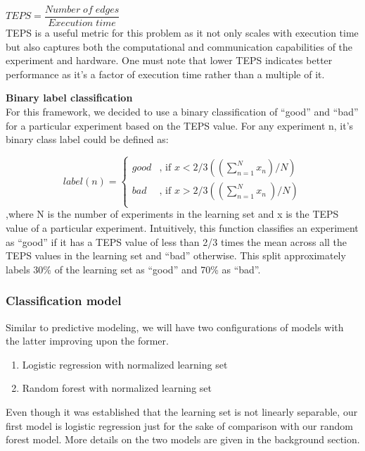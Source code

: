    $TEPS= \dfrac{Number\;of\; edges}{Execution\;time}$ \\


TEPS is a useful metric for this problem as it not only scales with execution time but also captures both the computational and communication capabilities of the experiment and hardware. One must note that lower TEPS indicates better performance as it's a factor of execution time rather than a multiple of it. 

\textbf{Binary label classification}\\
For this framework, we decided to use a binary classification of ``good'' and ``bad'' for a particular experiment based on the TEPS value. For any experiment n, it's binary class label could be defined as:


\[
  label(n) =
  \begin{cases}
                                   good & \text{, if $x < 2/3((\sum_{n=1}^{N} x_{n} )/N)$} \\
                                   bad & \text{, if $x > 2/3((\sum_{n=1}^{N} x_{n} \ )/N)$} \\
  \end{cases}
\]
 ,where N is the number of experiments in the learning set and x is the TEPS value of a particular experiment. Intuitively, this function classifies an experiment as ``good'' if it has a TEPS value of less than 2/3 times the mean across all the TEPS values in the learning set and ``bad'' otherwise. This split approximately labels 30\% of the learning set as ``good'' and 70\% as ``bad''.
   
\subsubsection{Classification model}
Similar to predictive modeling, we will have two configurations of models with the latter improving upon the former. 


\begin{enumerate}
    \item Logistic regression with normalized learning set
    \item Random forest with normalized learning set
\end{enumerate}
Even though it was established that the learning set is not linearly separable, our first model is logistic regression just for the sake of comparison with our random forest model. More details on the two models are given in the background section.\\

